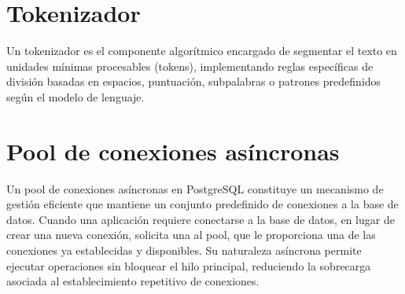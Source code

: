 \section{Tokenizador}
\label{anexo:tokenizer}
Un tokenizador es el componente algorítmico encargado de segmentar el texto en unidades mínimas procesables (tokens), implementando reglas específicas de división basadas en espacios, puntuación, subpalabras o patrones predefinidos según el modelo de lenguaje.

\section{Pool de conexiones asíncronas}
\label{anexo:pool}
Un pool de conexiones asíncronas en PostgreSQL constituye un mecanismo de gestión eficiente que mantiene un conjunto predefinido de conexiones a la base de datos. Cuando una aplicación requiere conectarse a la base de datos, en lugar de crear una nueva conexión, solicita una al pool, que le proporciona una de las conexiones ya establecidas y disponibles. Su naturaleza asíncrona permite ejecutar operaciones sin bloquear el hilo principal, reduciendo la sobrecarga asociada al establecimiento repetitivo de conexiones.


